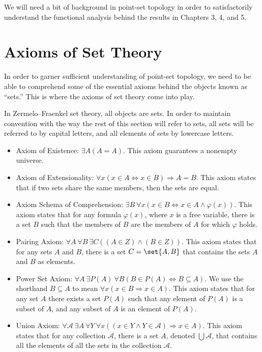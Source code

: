 We will need a bit of background in point-set topology in order to satisfactorily understand the functional analysis behind the results in Chapters 3, 4, and 5.
\section{Axioms of Set Theory}%
In order to garner sufficient understanding of point-set topology, we need to be able to comprehend some of the essential axioms behind the objects known as ``sets.'' This is where the axioms of set theory come into play.
\begin{definition}
  In Zermelo--Fraenkel set theory, all objects are sets. In order to maintain convention with the way the rest of this section will refer to sets, all sets will be referred to by capital letters, and all elements of sets by lowercase letters.
  \begin{itemize}
    \item Axiom of Existence: $\exists A\left(A = A\right)$. This axiom guarantees a nonempty universe.
    \item Axiom of Extensionality: $\forall x\left(x\in A \Leftrightarrow x\in B\right)\Rightarrow A = B$. This axiom states that if two sets share the same members, then the sets are equal.
    \item Axiom Schema of Comprehension: $\exists B\:\forall x\left(x\in B\Leftrightarrow x\in A \wedge\varphi(x)\right)$. This axiom states that for any formula $\varphi(x)$, where $x$ is a free variable, there is a set $B$ such that the members of $B$ are the members of $A$ for which $\varphi$ holds.
    \item Pairing Axiom: $\forall A\:\forall B\:\exists C\left(\left(A\in Z\right)\wedge \left(B\in Z\right)\right)$. This axiom states that for any sets $A$ and $B$, there is a set $C = \set{A,B}$ that contains the sets $A$ and $B$ as elements.
    \item Power Set Axiom: $\forall A\:\exists P(A)\:\forall B\left(B\in P(A) \Leftrightarrow B\subseteq A\right)$. We use the shorthand $B\subseteq A$ to mean $\forall x\left(x\in B\Rightarrow x\in A\right)$. This axiom states that for any set $A$ there exists a set $P(A)$ such that any element of $P(A)$ is a subset of $A$, and any subset of $A$ is an element of $P(A)$.
    \item Union Axiom: $\forall \mathcal{A}\:\exists A\:\forall Y\:\forall x\left(\left(x\in Y\wedge Y\in \mathcal{A}\right)\Rightarrow x\in A\right)$. This axiom states that for any collection $\mathcal{A}$, there is a set $A $, denoted $ \bigcup \mathcal{A}$, that contains all the elements of all the sets in the collection $\mathcal{A}$.

\end{itemize}
\end{definition}
